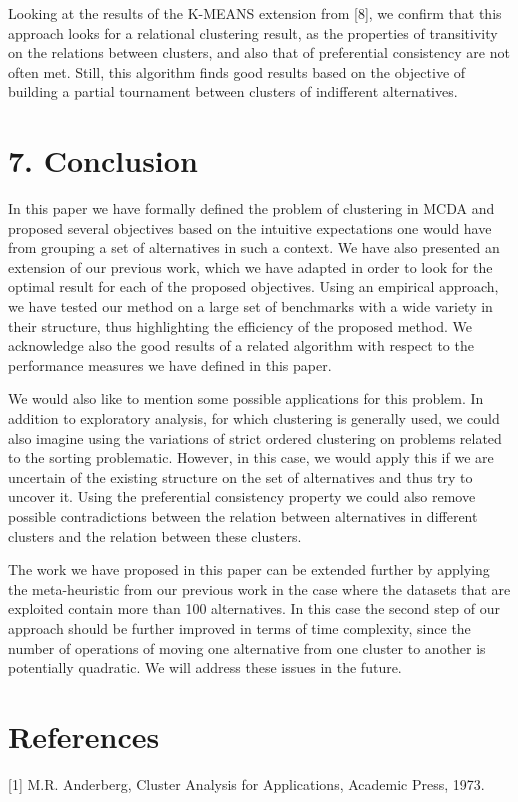 \documentclass[10pt]{article}
\begin{document}
Looking at the results of the K-MEANS extension from [8], we confirm that this approach looks for a relational clustering result, as the properties of transitivity on the relations between clusters, and also that of preferential consistency are not often met. Still, this algorithm finds good results based on the objective of building a partial tournament between clusters of indifferent alternatives.

\section*{7. Conclusion}
In this paper we have formally defined the problem of clustering in MCDA and proposed several objectives based on the intuitive expectations one would have from grouping a set of alternatives in such a context. We have also presented an extension of our previous work, which we have adapted in order to look for the optimal result for each of the proposed objectives. Using an empirical approach, we have tested our method on a large set of benchmarks with a wide variety in their structure, thus highlighting the efficiency of the proposed method. We acknowledge also the good results of a related algorithm with respect to the performance measures we have defined in this paper.

We would also like to mention some possible applications for this problem. In addition to exploratory analysis, for which clustering is generally used, we could also imagine using the variations of strict ordered clustering on problems related to the sorting problematic. However, in this case, we would apply this if we are uncertain of the existing structure on the set of alternatives and thus try to uncover it. Using the preferential consistency property we could also remove possible contradictions between the relation between alternatives in different clusters and the relation between these clusters.

The work we have proposed in this paper can be extended further by applying the meta-heuristic from our previous work in the case where the datasets that are exploited contain more than 100 alternatives. In this case the second step of our approach should be further improved in terms of time complexity, since the number of operations of moving one alternative from one cluster to another is potentially quadratic. We will address these issues in the future.

\section*{References}
[1] M.R. Anderberg, Cluster Analysis for Applications, Academic Press, 1973.
\end{document}

